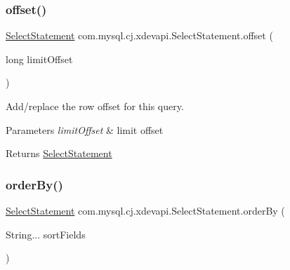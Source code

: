 \mbox{\label{interfacecom_1_1mysql_1_1cj_1_1xdevapi_1_1_select_statement_af36d8c50049615adbb960284711af58b}} 
\subsubsection{\texorpdfstring{offset()}{offset()}}
{\footnotesize\ttfamily \mbox{\hyperlink{interfacecom_1_1mysql_1_1cj_1_1xdevapi_1_1_select_statement}{Select\+Statement}} com.\+mysql.\+cj.\+xdevapi.\+Select\+Statement.\+offset (\begin{DoxyParamCaption}\item[{long}]{limit\+Offset }\end{DoxyParamCaption})}

Add/replace the row offset for this query.


\begin{DoxyParams}{Parameters}
{\em limit\+Offset} & limit offset \\
\hline
\end{DoxyParams}
\begin{DoxyReturn}{Returns}
\mbox{\hyperlink{interfacecom_1_1mysql_1_1cj_1_1xdevapi_1_1_select_statement}{Select\+Statement}} 
\end{DoxyReturn}
\mbox{\label{interfacecom_1_1mysql_1_1cj_1_1xdevapi_1_1_select_statement_a79a5fd02de586c02a6179002efe76efa}} 
\subsubsection{\texorpdfstring{order\+By()}{orderBy()}}
{\footnotesize\ttfamily \mbox{\hyperlink{interfacecom_1_1mysql_1_1cj_1_1xdevapi_1_1_select_statement}{Select\+Statement}} com.\+mysql.\+cj.\+xdevapi.\+Select\+Statement.\+order\+By (\begin{DoxyParamCaption}\item[{String...}]{sort\+Fields }\end{DoxyParamCaption})}

